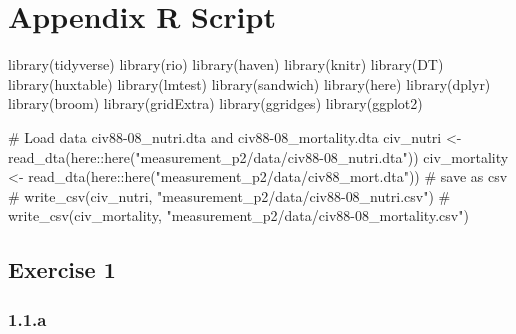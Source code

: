 \documentclass[
  letterpaper,
  DIV=11,
  numbers=noendperiod]{scrartcl}
\author{}
\date{}
\newenvironment{Shaded}{\begin{snugshade}}{\end{snugshade}}
\newcommand{\CommentTok}[1]{\textcolor[rgb]{0.37,0.37,0.37}{#1}}
\newcommand{\FunctionTok}[1]{\textcolor[rgb]{0.28,0.35,0.67}{#1}}
\newcommand{\NormalTok}[1]{\textcolor[rgb]{0.00,0.23,0.31}{#1}}
\newcommand{\OtherTok}[1]{\textcolor[rgb]{0.00,0.23,0.31}{#1}}
\newcommand{\SpecialCharTok}[1]{\textcolor[rgb]{0.37,0.37,0.37}{#1}}
\newcommand{\StringTok}[1]{\textcolor[rgb]{0.13,0.47,0.30}{#1}}
\begin{document}
\section{Appendix R Script}\label{appendix-r-script}

\begin{Shaded}
\begin{Highlighting}[]
\FunctionTok{library}\NormalTok{(tidyverse)}
\FunctionTok{library}\NormalTok{(rio)}
\FunctionTok{library}\NormalTok{(haven)}
\FunctionTok{library}\NormalTok{(knitr)}
\FunctionTok{library}\NormalTok{(DT)}
\FunctionTok{library}\NormalTok{(huxtable)}
\FunctionTok{library}\NormalTok{(lmtest)}
\FunctionTok{library}\NormalTok{(sandwich)}
\FunctionTok{library}\NormalTok{(here)}
\FunctionTok{library}\NormalTok{(dplyr)}
\FunctionTok{library}\NormalTok{(broom)}
\FunctionTok{library}\NormalTok{(gridExtra)}
\FunctionTok{library}\NormalTok{(ggridges)}
\FunctionTok{library}\NormalTok{(ggplot2)}
\end{Highlighting}
\end{Shaded}

\begin{Shaded}
\begin{Highlighting}[]
\CommentTok{\# Load data civ88{-}08\_nutri.dta and civ88{-}08\_mortality.dta}
\NormalTok{civ\_nutri }\OtherTok{\textless{}{-}} \FunctionTok{read\_dta}\NormalTok{(here}\SpecialCharTok{::}\FunctionTok{here}\NormalTok{(}\StringTok{"measurement\_p2/data/civ88{-}08\_nutri.dta"}\NormalTok{))}
\NormalTok{civ\_mortality }\OtherTok{\textless{}{-}} \FunctionTok{read\_dta}\NormalTok{(here}\SpecialCharTok{::}\FunctionTok{here}\NormalTok{(}\StringTok{"measurement\_p2/data/civ88\_mort.dta"}\NormalTok{))}
\CommentTok{\# save as csv}
\CommentTok{\# write\_csv(civ\_nutri, "measurement\_p2/data/civ88{-}08\_nutri.csv")}
\CommentTok{\# write\_csv(civ\_mortality, "measurement\_p2/data/civ88{-}08\_mortality.csv")}
\end{Highlighting}
\end{Shaded}

\subsection{Exercise 1}\label{exercise-1}

\subsubsection{1.1.a}\label{a}
\end{document}

